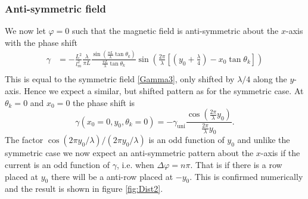 \subsubsection{Anti-symmetric field}
We now let $\varphi = 0$ such that the magnetic field is anti-symmetric about the $x$-axis with the phase shift
\begin{equation}
\begin{split}
    \gamma &= -\frac{L^2}{l_m^2}\frac{\lambda}{\pi L }\frac{\sin\left(\frac{\pi L}{\lambda}\tan\theta_k\right)}{\frac{\pi L}{\lambda}\tan\theta_k}\sin\left(\frac{2\pi}{\lambda}\left[\left(y_0+\frac{\lambda}{4}\right)-x_0\tan\theta_k\right]\right)\\
\end{split}
\end{equation}
This is equal to the symmetric field \eqref{Gamma3}, only shifted by $\lambda/4$ along the $y$-axis. Hence we expect a similar, but shifted pattern as for the symmetric case. At $\theta_k = 0$ and $x_0 = 0$ the phase shift is 
\begin{equation}
    \gamma(x_0=0, y_0, \theta_k = 0) = -\gamma_{\mathrm{uni}} \frac{\cos\left(\frac{2\pi}{\lambda}y_0\right)}{\frac{2\pi}{\lambda}y_0}.
\end{equation}
The factor $\cos(2\pi y_0/\lambda)/(2\pi y_0 /\lambda)$ is an odd function of $y_0$ and unlike the symmetric case we now expect an anti-symmetric pattern about the $x$-axis if the current is an odd function of $\gamma$, i.e. when $\Delta \varphi = n\pi$. That is if there is a row placed at $y_0$ there will be a anti-row placed at $-y_0$. This is confirmed numerically and the result is shown in figure \eqref{fig:Dist2}.
